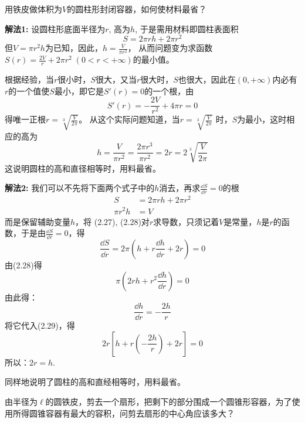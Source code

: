 \begin{example}
    用铁皮做体积为$V$的圆柱形封闭容器，如何使材料最省？
\end{example}


\begin{solution}
\textbf{解法1:} 设圆柱形底面半径为$r$, 高为$h$, 于是需用材料即圆柱表面积
\[S=2\pi rh+2\pi r^2\]
但$V=\pi r^2h$为已知，因此，$h=\frac{V}{\pi r^2}$，
从而问题变为求函数$S(r)=\frac{2V}{r}+2\pi r^2\; (0<r<+\infty)$的最小值。

根据经验，当$r$很小时，$S$很大，又当$r$很大时，$S$也很大，因此在$(0,+\infty)$内必有$r$的一个值使$S$最小，即它是$S'(r)=0$的一个根，由
\[S' (r) =-\frac{2V}{r^2}+4\pi r=0\]
得唯一正根$r=\sqrt[3]{\frac{V}{2\pi}}$。
从这个实际问题知道，当$r=\sqrt[3]{\frac{V}{2\pi}}$
时，$S$为最小，这时相应的高为
\[h=\frac{V}{\pi r^2}=\frac{2\pi r^3}{\pi r^2}=2r=2\sqrt[3]{\frac{V}{2\pi}}\]
这说明圆柱的高和直径相等时，用料最省。

\textbf{解法2:}  我们可以不先将下面两个式子中的$h$消去，再求$\frac{\dd S}{\dd r}=0$的根
\begin{align}
    S&=2\pi r h+2\pi r^2\\
    \pi r^2 h&=V
\end{align}
而是保留辅助变量$h$，将
(2.27), (2.28)对$r$求导数，只须记着$V$是常量，$h$是$r$的函数，于是由$\frac{\dd S}{\dd r}=0$，得
\begin{equation}
    \frac{\dd S}{\dd r}=2\pi\left(h+r\frac{\dd h}{\dd r}+2r\right)=0
\end{equation}
由(2.28)得
\begin{equation}
    \pi\left(2rh+r^2\frac{\dd h}{\dd r}\right)=0
\end{equation}
由此得：
\[\frac{\dd h}{\dd r}=-\frac{2h}{r}\]
将它代入(2.29)，得
\[2r\left[h+r\left(-\frac{2h}{r}\right)+2r\right]=0\]
所以：$2r=h$. 

同样地说明了圆柱的高和直经相等时，用料最省。
\end{solution}


\begin{example}
由半径为$\ell$的圆铁皮，剪去一个扇形，把剩下的部分围成一个圆锥形容器，为了使用所得圆锥容器有最大的容积，问剪去扇形的中心角应该多大？
\end{example}

